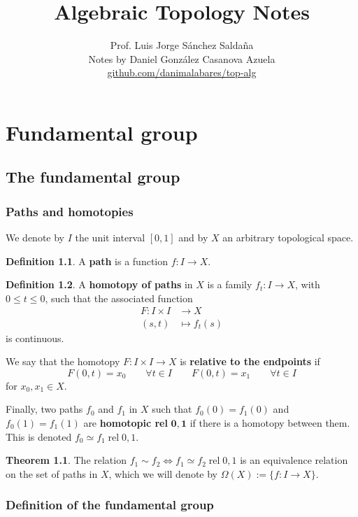 \documentclass{book}
\title{Algebraic Topology Notes}
\author{Prof. Luis Jorge S\'anchez Salda\~na\\
Notes by Daniel Gonz\'alez Casanova Azuela\\
\href{https://github.com/danimalabares/top-alg}{github.com/danimalabares/top-alg}}
\theoremstyle{definition}
\newtheorem*{defn}{Definition}
\newtheorem*{teo}{Theorem}
\DeclareMathOperator{\rel}{rel}
\begin{document}
\maketitle
{}
{}
\tableofcontents

\part{Fundamental group}

\chapter{The fundamental group}

\section{Paths and homotopies}

We denote by $I$ the unit interval $[0,1]$ and by
$X$ an arbitrary topological space.

\begin{defn}
A \textbf{path} is a function $f:I\to X$.
\end{defn}

\begin{defn}
A \textbf{homotopy of paths} in $X$ is a family
$f_t:I\to X$, with $0\leq t\leq0$, such that the
associated function
$$
\begin{aligned}
F:I\times I&\to X\\
(s,t)&\mapsto f_t(s)
\end{aligned}
$$
is continuous.

We say that the homotopy $F:I\times I\to X$ is
\textbf{relative to the endpoints} if
$$
F(0,t)=x_0\qquad\forall t\in I
\qquad
F(0,t)=x_1\qquad\forall t\in I
$$
for $x_0,x_1\in X$.

Finally, two paths $f_0$ and $f_1$ in $X$ such that
$f_0(0)=f_1(0)$ and $f_0(1)=f_1(1)$ are
\textbf{homotopic rel} $\mathbf{0,1}$ if there is a
homotopy between them. This is denoted
$f_0\simeq f_1\rel0,1$.
\end{defn}

\begin{teo}
The relation
$f_1\sim{}f_2\iff f_1\simeq f_2\rel0,1$ is an
equivalence relation on the set of paths in $X$, which we
will denote by $\Omega(X):=\{f:I\to X\}$.
\end{teo}

\section{Definition of the fundamental group}
\end{document}
